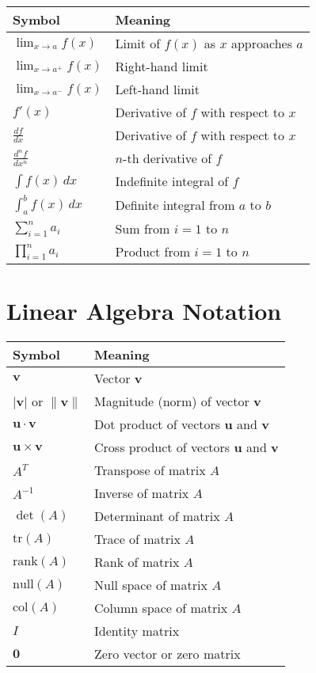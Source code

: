 \begin{tabular}{|l|l|}
\hline
\textbf{Symbol} & \textbf{Meaning} \\
\hline
$\lim_{x \to a} f(x)$ & Limit of $f(x)$ as $x$ approaches $a$ \\
$\lim_{x \to a^+} f(x)$ & Right-hand limit \\
$\lim_{x \to a^-} f(x)$ & Left-hand limit \\
$f'(x)$ & Derivative of $f$ with respect to $x$ \\
$\frac{df}{dx}$ & Derivative of $f$ with respect to $x$ \\
$\frac{d^n f}{dx^n}$ & $n$-th derivative of $f$ \\
$\int f(x) \, dx$ & Indefinite integral of $f$ \\
$\int_a^b f(x) \, dx$ & Definite integral from $a$ to $b$ \\
$\sum_{i=1}^n a_i$ & Sum from $i=1$ to $n$ \\
$\prod_{i=1}^n a_i$ & Product from $i=1$ to $n$ \\
\hline
\end{tabular}

\section{Linear Algebra Notation}

\begin{tabular}{|l|l|}
\hline
\textbf{Symbol} & \textbf{Meaning} \\
\hline
$\mathbf{v}$ & Vector $\mathbf{v}$ \\
$|\mathbf{v}|$ or $\|\mathbf{v}\|$ & Magnitude (norm) of vector $\mathbf{v}$ \\
$\mathbf{u} \cdot \mathbf{v}$ & Dot product of vectors $\mathbf{u}$ and $\mathbf{v}$ \\
$\mathbf{u} \times \mathbf{v}$ & Cross product of vectors $\mathbf{u}$ and $\mathbf{v}$ \\
$A^T$ & Transpose of matrix $A$ \\
$A^{-1}$ & Inverse of matrix $A$ \\
$\det(A)$ & Determinant of matrix $A$ \\
$\text{tr}(A)$ & Trace of matrix $A$ \\
$\text{rank}(A)$ & Rank of matrix $A$ \\
$\text{null}(A)$ & Null space of matrix $A$ \\
$\text{col}(A)$ & Column space of matrix $A$ \\
$I$ & Identity matrix \\
$\mathbf{0}$ & Zero vector or zero matrix \\
\hline
\end{tabular}

